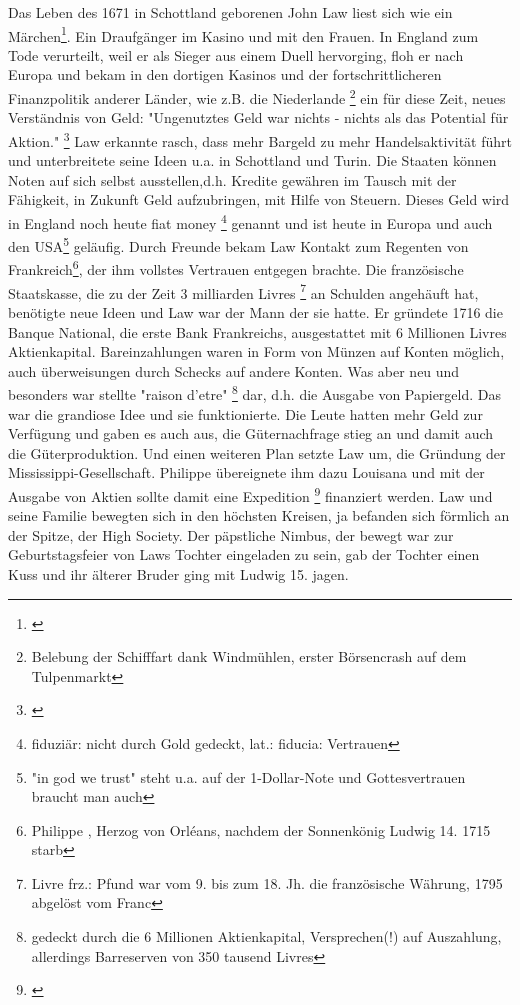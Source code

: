\documentclass[
        onecolumn,
        a4paper,
        abstracton,
        parskip=half
        ,final
        ]{scrartcl}
\begin{document}
Das Leben des 1671 in Schottland geborenen John Law liest sich wie ein M{\"a}rchen\footnote[1]{\citep*[vgl.][Kap.2]{strathern2006schumpeters}}. Ein Draufg{\"a}nger im Kasino und mit den Frauen. In England zum Tode verurteilt, weil er als Sieger aus einem Duell hervorging, floh er nach Europa und bekam in den dortigen Kasinos und der fortschrittlicheren Finanzpolitik anderer L{\"a}nder, wie z.B. die Niederlande \footnote[2]{Belebung der Schifffart dank Windm{\"u}hlen, erster B{\"o}rsencrash auf dem Tulpenmarkt} ein f{\"u}r diese Zeit, neues Verst{\"a}ndnis von Geld: "Ungenutztes Geld war nichts - nichts als das Potential f{\"u}r Aktion." \footnote[3]{\citep*[vgl.][Kap.3]{strathern2006schumpeters}} Law erkannte rasch, dass mehr Bargeld zu mehr Handelsaktivit{\"a}t f{\"u}hrt und unterbreitete seine Ideen u.a. in Schottland und Turin. Die Staaten k{\"o}nnen Noten auf sich selbst ausstellen,d.h. Kredite gew{\"a}hren im Tausch mit der F{\"a}higkeit, in Zukunft Geld aufzubringen, mit Hilfe von Steuern. Dieses Geld wird in England noch heute fiat money \footnote[4]{fiduzi{\"a}r: nicht durch Gold gedeckt, lat.: fiducia: Vertrauen} genannt und ist heute in Europa und auch den USA\footnote[5]{"in god we trust" steht u.a. auf der 1-Dollar-Note und Gottesvertrauen braucht man auch} gel{\"a}ufig. Durch Freunde bekam Law Kontakt zum Regenten von Frankreich\footnote[6]{Philippe , Herzog von Orl\'{e}ans, nachdem der Sonnenk{\"o}nig Ludwig 14. 1715 starb}, der ihm vollstes Vertrauen entgegen brachte. Die franz{\"o}sische Staatskasse, die zu der Zeit 3 milliarden Livres \footnote[7]{Livre frz.: Pfund war vom 9. bis zum 18. Jh. die franz{\"o}sische W{\"a}hrung, 1795 abgel{\"o}st vom Franc} an Schulden angeh{\"a}uft hat, ben{\"o}tigte neue Ideen und Law war der Mann der sie hatte. Er gr{\"u}ndete 1716 die Banque National, die erste Bank Frankreichs, ausgestattet mit 6 Millionen Livres Aktienkapital. Bareinzahlungen waren in Form von M{\"u}nzen auf Konten m{\"o}glich, auch {\"u}berweisungen durch Schecks auf andere Konten. Was aber neu und besonders war stellte "raison d'etre" \footnote[8]{gedeckt durch die 6 Millionen Aktienkapital, Versprechen(!) auf Auszahlung, allerdings Barreserven von 350 tausend Livres} dar, d.h. die Ausgabe von Papiergeld. Das war die grandiose Idee und sie funktionierte. Die Leute hatten mehr Geld zur Verf{\"u}gung und gaben es auch aus, die G{\"u}ternachfrage stieg an und damit auch die G{\"u}terproduktion. Und einen weiteren Plan setzte Law um, die Gr{\"u}ndung der Mississippi-Gesellschaft. Philippe {\"u}bereignete ihm dazu Louisana und mit der Ausgabe von Aktien sollte damit eine Expedition \footnote[9]{\citep*[vgl.][Kap.3]{strathern2006schumpeters}} finanziert werden. Law und seine Familie bewegten sich in den h{\"o}chsten Kreisen, ja befanden sich f{\"o}rmlich an der Spitze, der High Society. Der p{\"a}pstliche Nimbus, der bewegt war zur Geburtstagsfeier von Laws Tochter eingeladen zu sein, gab der Tochter einen Kuss und ihr {\"a}lterer Bruder ging mit Ludwig 15. jagen.
\end{document}
